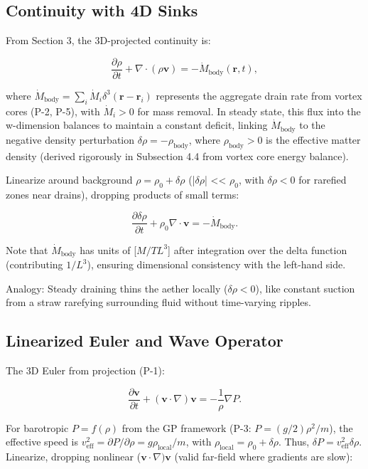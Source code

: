 \documentclass{article}
\begin{document}
\subsection{Continuity with 4D Sinks}

From Section 3, the 3D-projected continuity is:

\[
\frac{\partial \rho}{\partial t} + \nabla \cdot (\rho \mathbf{v}) = -\dot{M}_{\text{body}}(\mathbf{r}, t),
\]

where $\dot{M}_{\text{body}} = \sum_i \dot{M}_i \delta^3(\mathbf{r} - \mathbf{r}_i)$ represents the aggregate drain rate from vortex cores (P-2, P-5), with $\dot{M}_i > 0$ for mass removal. In steady state, this flux into the w-dimension balances to maintain a constant deficit, linking $\dot{M}_{\text{body}}$ to the negative density perturbation $\delta \rho = -\rho_{\text{body}}$, where $\rho_{\text{body}} > 0$ is the effective matter density (derived rigorously in Subsection 4.4 from vortex core energy balance).

Linearize around background $\rho = \rho_0 + \delta \rho$ (|$ \delta \rho $| << $\rho_0$, with $\delta \rho < 0$ for rarefied zones near drains), dropping products of small terms:

\[
\frac{\partial \delta \rho}{\partial t} + \rho_0 \nabla \cdot \mathbf{v} = -\dot{M}_{\text{body}}.
\]

Note that $\dot{M}_{\text{body}}$ has units of [$M/T L^3$] after integration over the delta function (contributing $1/L^3$), ensuring dimensional consistency with the left-hand side.

Analogy: Steady draining thins the aether locally ($\delta \rho < 0$), like constant suction from a straw rarefying surrounding fluid without time-varying ripples.

\subsection{Linearized Euler and Wave Operator}

The 3D Euler from projection (P-1):

\[
\frac{\partial \mathbf{v}}{\partial t} + (\mathbf{v} \cdot \nabla) \mathbf{v} = -\frac{1}{\rho} \nabla P.
\]

For barotropic $P = f(\rho)$ from the GP framework (P-3: $P = (g/2) \rho^2 / m$), the effective speed is $v_{\text{eff}}^2 = \partial P / \partial \rho = g \rho_{\text{local}} / m$, with $\rho_{\text{local}} = \rho_0 + \delta \rho$. Thus, $\delta P = v_{\text{eff}}^2 \delta \rho$. Linearize, dropping nonlinear ($\mathbf{v} \cdot \nabla) \mathbf{v}$ (valid far-field where gradients are slow):
\end{document}
